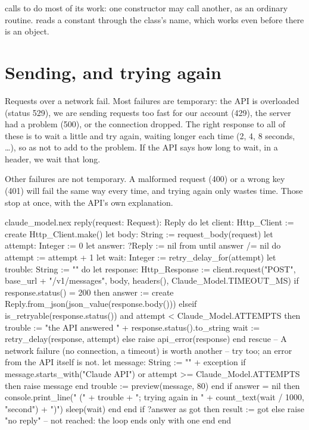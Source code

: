  calls  to do most of its work: one
constructor may call another, as an ordinary routine.
 reads a constant through the class's name,
which works even before there is an object.

\section{Sending, and trying again}

Requests over a network fail. Most failures are temporary: the API is
overloaded (status 529), we are sending requests too fast for our account
(429), the server had a problem (500), or the connection dropped. The
right response to all of these is to wait a little and try again, waiting
longer each time (2, 4, 8 seconds, \ldots), so as not to add to the
problem. If the API says how long to wait, in a  header,
we wait that long.

Other failures are not temporary. A malformed request (400) or a wrong key
(401) will fail the same way every time, and trying again only wastes time.
Those stop at once, with the API's own explanation.

\begin{continued}{claude_model.nex}
  reply(request: Request): Reply do
    let client: Http_Client := create Http_Client.make()
    let body: String := request_body(request)
    let attempt: Integer := 0
    let answer: ?Reply := nil
    from until answer /= nil do
      attempt := attempt + 1
      let wait: Integer := retry_delay_for(attempt)
      let trouble: String := ""
      do
        let response: Http_Response := client.request("POST", base_url + "/v1/messages",
          body, headers(), Claude_Model.TIMEOUT_MS)
        if response.status() = 200 then
          answer := create Reply.from_json(json_value(response.body()))
        elseif is_retryable(response.status()) and attempt < Claude_Model.ATTEMPTS then
          trouble := "the API answered " + response.status().to_string
          wait := retry_delay(response, attempt)
        else
          raise api_error(response)
        end
      rescue
        -- A network failure (no connection, a timeout) is worth another
        -- try too; an error from the API itself is not.
        let message: String := "" + exception
        if message.starts_with("Claude API") or attempt >= Claude_Model.ATTEMPTS then
          raise message
        end
        trouble := preview(message, 80)
      end
      if answer = nil then
        console.print_line("  (" + trouble + "; trying again in "
          + count_text(wait / 1000, "second") + ")")
        sleep(wait)
      end
    end
    if ?answer as got then
      result := got
    else
      raise "no reply"    -- not reached: the loop ends only with one
    end
  end
\end{continued}

